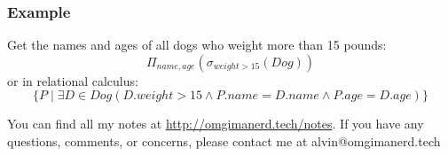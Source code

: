 \documentclass{math}
\begin{document}
\subsubsection*{Example}
Get the names and ages of all dogs who weight more than 15 pounds:
\[ \Pi_{name,age}(\sigma_{weight>15}(Dog)) \]
or in relational calculus:
\[ \{P\mid\exists D\in Dog(D.weight>15\wedge P.name=D.name\wedge
  P.age=D.age)\} \]

\begin{center}
  You can find all my notes at \url{http://omgimanerd.tech/notes}. If you have
  any questions, comments, or concerns, please contact me at
  alvin@omgimanerd.tech
\end{center}
\end{document}
